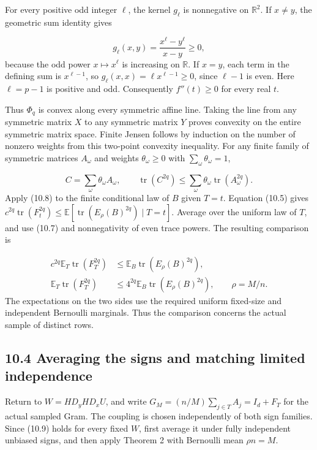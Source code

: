 \documentclass[11pt,a4paper]{article}
\begin{document}
For every positive odd integer \(\ell\), the kernel \(g_\ell\) is nonnegative on \(\mathbb R^2\). If \(x\ne y\), the geometric sum identity gives

\begin{equation*}
g_\ell(x,y)=\frac{x^\ell-y^\ell}{x-y}\ge0,
\end{equation*}
because the odd power \(x\mapsto x^\ell\) is increasing on \(\mathbb R\). If \(x=y\), each term in the defining sum is \(x^{\ell-1}\), so \(g_\ell(x,x)=\ell x^{\ell-1}\ge0\), since \(\ell-1\) is even. Here \(\ell=p-1\) is positive and odd. Consequently \(f''(t)\ge0\) for every real \(t\).

Thus \(\Phi_q\) is convex along every symmetric affine line. Taking the line from any symmetric matrix \(X\) to any symmetric matrix \(Y\) proves convexity on the entire symmetric matrix space. Finite Jensen follows by induction on the number of nonzero weights from this two-point convexity inequality. For any finite family of symmetric matrices \(A_\omega\) and weights \(\theta_\omega\ge0\) with \(\sum_\omega\theta_\omega=1\),

\begin{equation}
C=\sum_\omega\theta_\omega A_\omega,
\qquad
\operatorname{tr}(C^{2q})
\le\sum_\omega\theta_\omega\operatorname{tr}(A_\omega^{2q}).
\tag{10.8}
\end{equation}
Apply (10.8) to the finite conditional law of \(B\) given \(T=t\). Equation (10.5) gives \(c^{2q}\operatorname{tr}(F_t^{2q})\le\mathbb E[\operatorname{tr}(E_\rho(B)^{2q})\mid T=t]\). Average over the uniform law of \(T\), and use (10.7) and nonnegativity of even trace powers. The resulting comparison is

\begin{equation}
\begin{aligned}
c^{2q}\mathbb E_T\operatorname{tr}(F_T^{2q})
&\le\mathbb E_B\operatorname{tr}(E_\rho(B)^{2q}),\\
\mathbb E_T\operatorname{tr}(F_T^{2q})
&\le4^{2q}\mathbb E_B\operatorname{tr}(E_\rho(B)^{2q}),
\qquad \rho=M/n.
\end{aligned}
\tag{10.9}
\end{equation}
The expectations on the two sides use the required uniform fixed-size and independent Bernoulli marginals. Thus the comparison concerns the actual sample of distinct rows.

\subsection*{10.4 Averaging the signs and matching limited independence}
Return to \(W=HD_yHD_xU\), and write \(G_M=(n/M)\sum_{j\in T}A_j=I_d+F_T\) for the actual sampled Gram. The coupling is chosen independently of both sign families. Since (10.9) holds for every fixed \(W\), first average it under fully independent unbiased signs, and then apply Theorem 2 with Bernoulli mean \(\rho n=M\).
\end{document}

